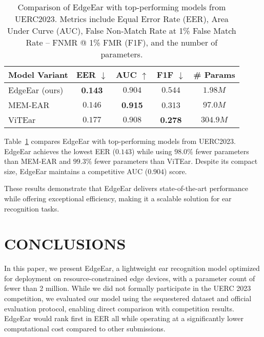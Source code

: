 \documentclass[a4paper, 10pt, conference]{ieeeconf}
\begin{document}
\begin{table}[ht]
\centering
\caption{Comparison of EdgeEar with top-performing models from UERC2023. Metrics include Equal Error Rate (EER), Area Under Curve (AUC), False Non-Match Rate at 1\% False Match Rate – FNMR @ 1\% FMR (F1F), and the number of parameters.}
\label{tab:uerc_ranking}
\begin{tabular}{@{}lcccc@{}}
\toprule
\textbf{Model Variant}                   & \textbf{EER} $\downarrow$ & \textbf{AUC} $\uparrow$ & \textbf{F1F} $\downarrow$ & \textbf{\# Params} \\ \midrule
EdgeEar (ours)                           & \textbf{0.143}                 & $0.904$                 & $0.544$               & $1.98M$                  \\
MEM-EAR                & $0.146$                 & \textbf{0.915}                 & 0.313                & $97.0M$                 \\
ViTEar                 & $0.177$                 & $0.908$                 & \textbf{0.278}                & $304.9M$                 \\ 
\bottomrule
\end{tabular}
\end{table}

Table~\ref{tab:uerc_ranking} compares EdgeEar with top-performing models from UERC2023. EdgeEar achieves the lowest EER ($0.143$) while using $98.0\%$ fewer parameters than MEM-EAR and $99.3\%$ fewer parameters than ViTEar. Despite its compact size, EdgeEar maintains a competitive AUC ($0.904$) score.

These results demonstrate that EdgeEar delivers state-of-the-art performance while offering exceptional efficiency, making it a scalable solution for ear recognition tasks.


\addtolength{\textheight}{-0cm} 
\section{CONCLUSIONS}

In this paper, we present EdgeEar, a lightweight ear recognition model optimized for deployment on resource-constrained edge devices, with a parameter count of fewer than 2 million. While we did not formally participate in the UERC 2023 competition, we evaluated our model using the sequestered dataset and official evaluation protocol, enabling direct comparison with competition results. EdgeEar would rank first in EER all while operating at a significantly lower computational cost compared to other submissions.
\end{document}
